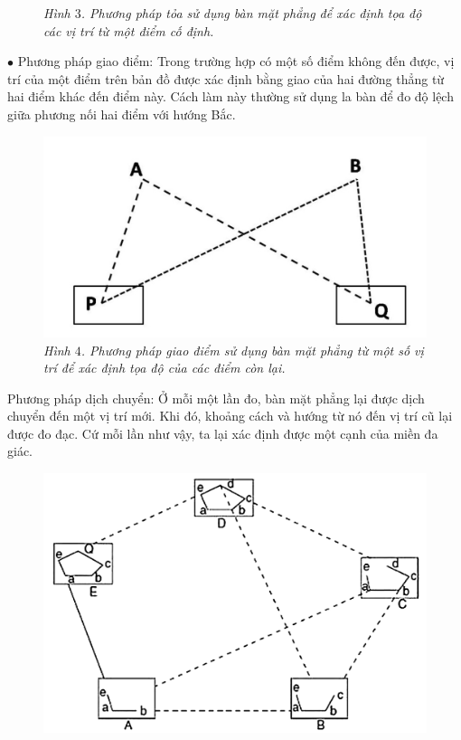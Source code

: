 \begin{multicols}{2}
\begin{figure}[H]
		\caption{\small\textit{\color{toanhocdoisong}Hình $3$. Phương pháp tỏa sử dụng bàn mặt phẳng để xác định tọa độ các vị trí từ một điểm cố định.}}
		\vspace*{-10pt}
	\end{figure}
	$\bullet$ Phương pháp giao điểm: Trong trường hợp có một số điểm không đến được, vị trí của một điểm trên bản đồ được xác định bằng giao của hai đường thẳng từ hai điểm khác đến điểm này. Cách làm này thường sử dụng la bàn để đo độ lệch giữa phương nối hai điểm với hướng Bắc.
	\begin{figure}[H]
		\vspace*{-5pt}
		\centering
		\captionsetup{labelformat= empty, justification=centering}
		\includegraphics[width= 1\linewidth]{7}
		\caption{\small\textit{\color{toanhocdoisong}Hình $4$. Phương pháp giao điểm sử dụng bàn mặt phẳng từ một số vị trí để xác định tọa độ của các điểm còn lại.}}
		\vspace*{-10pt}
	\end{figure}
	Phương pháp dịch chuyển: Ở mỗi một lần đo, bàn mặt phẳng lại được dịch chuyển đến một vị trí mới. Khi đó, khoảng cách và hướng từ nó đến vị trí cũ lại được đo đạc. Cứ mỗi lần như vậy, ta lại xác định được một cạnh của miền đa giác.
	\begin{figure}[H]
		\vspace*{5pt}
		\centering
		\captionsetup{labelformat= empty, justification=centering}
		\includegraphics[width= 1\linewidth]{8}

\end{figure}
\end{multicols}
